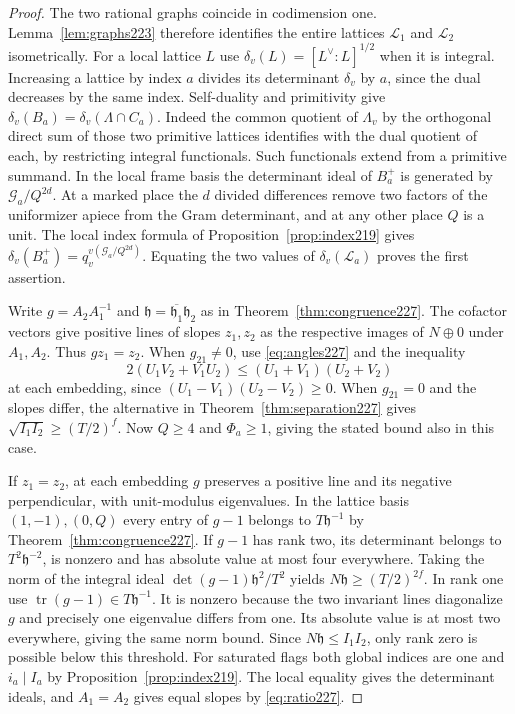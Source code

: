 \documentclass[a4paper,11pt]{article}
\theoremstyle{definition}
\theoremstyle{remark}
\numberwithin{equation}{section}
\begin{document}
\begin{proof}
The two rational graphs coincide in codimension one.
Lemma~\ref{lem:graphs223} therefore identifies the entire
lattices \(\mathcal L_1\) and \(\mathcal L_2\) isometrically.
For a local lattice \(L\) use
\(\delta_v(L)=[L^\vee:L]^{1/2}\) when it is integral.
Increasing a lattice by index \(a\) divides its determinant
\(\delta_v\) by \(a\), since the dual decreases by the same
index. Self-duality and primitivity give
\(\delta_v(B_a)=\delta_v(\Lambda\cap C_a)\). Indeed the
common quotient of \(\Lambda_v\) by the orthogonal direct
sum of those two primitive lattices identifies with the
dual quotient of each, by restricting integral functionals.
Such functionals extend from a primitive summand. In the
local frame basis the determinant ideal of \(B_a^+\) is
generated by \(\mathcal G_a/Q^{2d}\). At a marked place
the \(d\) divided differences remove two factors of the
uniformizer apiece from the Gram determinant, and at any
other place \(Q\) is a unit. The local index formula of
Proposition~\ref{prop:index219} gives
\(\delta_v(B_a^+)=q_v^{v(\mathcal G_a/Q^{2d})}\).
Equating the two values of \(\delta_v(\mathcal L_a)\) proves
the first assertion.

Write \(g=A_2 A_1^{-1}\) and
\(\mathfrak h=\overline{\mathfrak h_1}\mathfrak h_2\) as in
Theorem~\ref{thm:congruence227}. The cofactor vectors give
positive lines of slopes \(z_1,z_2\) as the respective
images of \(N\oplus0\) under \(A_1,A_2\). Thus \(gz_1=z_2\).
When \(g_{21}\ne0\), use \eqref{eq:angles227} and the inequality
\[
 2(U_1 V_2+V_1 U_2)\le(U_1+V_1)(U_2+V_2)
\]
at each embedding, since \((U_1-V_1)(U_2-V_2)\ge0\).
When \(g_{21}=0\) and the slopes differ, the alternative in
Theorem~\ref{thm:separation227} gives
\(\sqrt{I_1 I_2}\ge(T/2)^f\).
Now \(Q\ge4\) and \(\Phi_a\ge1\), giving the stated bound
also in this case.

If \(z_1=z_2\), at each embedding \(g\) preserves a positive
line and its negative perpendicular, with unit-modulus
eigenvalues. In the lattice basis \((1,-1),(0,Q)\) every
entry of \(g-1\) belongs to \(T\mathfrak h^{-1}\) by
Theorem~\ref{thm:congruence227}. If \(g-1\) has rank two,
its determinant belongs to \(T^2\mathfrak h^{-2}\), is nonzero
and has absolute value at most four everywhere. Taking the
norm of the integral ideal
\(\det(g-1)\mathfrak h^2/T^2\) yields
\(N\mathfrak h\ge(T/2)^{2f}\). In rank one use
\(\operatorname{tr}(g-1)\in T\mathfrak h^{-1}\). It is
nonzero because the two invariant lines diagonalize \(g\)
and precisely one eigenvalue differs from one. Its absolute
value is at most two everywhere, giving the same norm bound.
Since \(N\mathfrak h\le I_1I_2\), only rank zero is possible
below this threshold. For saturated flags both global indices
are one and \(i_a\mid I_a\) by Proposition~\ref{prop:index219}.
The local equality gives the determinant ideals, and \(A_1=A_2\)
gives equal slopes by \eqref{eq:ratio227}.
\end{proof}
\end{document}
